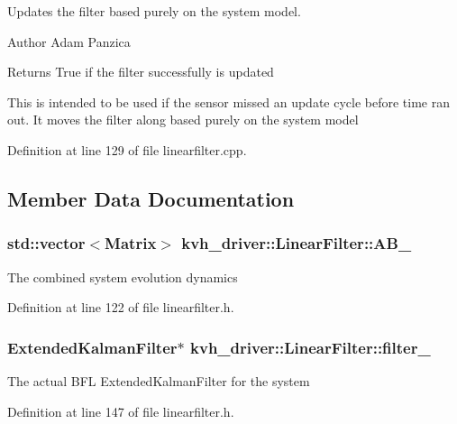 \-Updates the filter based purely on the system model. 

\begin{DoxyAuthor}{\-Author}
\-Adam \-Panzica 
\end{DoxyAuthor}
\begin{DoxyReturn}{\-Returns}
\-True if the filter successfully is updated
\end{DoxyReturn}
\-This is intended to be used if the sensor missed an update cycle before time ran out. \-It moves the filter along based purely on the system model 

\-Definition at line 129 of file linearfilter.\-cpp.



\subsection{\-Member \-Data \-Documentation}
\subsubsection[{\-A\-B\-\_\-}]{\setlength{\rightskip}{0pt plus 5cm}std\-::vector$<$\-Matrix$>$ {\bf kvh\-\_\-driver\-::\-Linear\-Filter\-::\-A\-B\-\_\-}\hspace{0.3cm}{\ttfamily  [protected]}}\label{classkvh__driver_1_1LinearFilter_adae42ec27ffc1a875ac73043436bc0c8}
\-The combined system evolution dynamics 

\-Definition at line 122 of file linearfilter.\-h.

\subsubsection[{filter\-\_\-}]{\setlength{\rightskip}{0pt plus 5cm}\-Extended\-Kalman\-Filter$\ast$ {\bf kvh\-\_\-driver\-::\-Linear\-Filter\-::filter\-\_\-}\hspace{0.3cm}{\ttfamily  [protected]}}\label{classkvh__driver_1_1LinearFilter_a40e94bfc20d6cd1a0cae43795af98d3f}
\-The actual \-B\-F\-L \-Extended\-Kalman\-Filter for the system 

\-Definition at line 147 of file linearfilter.\-h.

